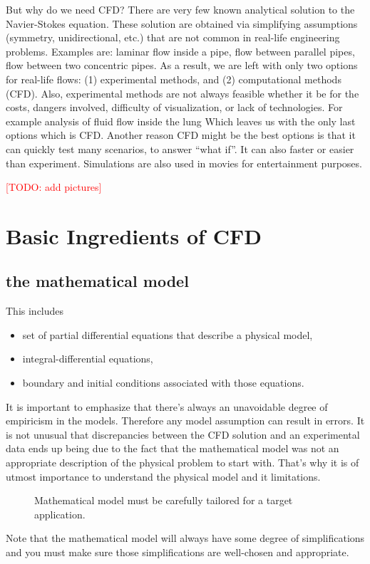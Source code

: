 But why do we need CFD?
There are very few known analytical solution to the Navier-Stokes equation.
These solution are obtained via simplifying assumptions (symmetry, unidirectional, etc.) that are not common in real-life engineering problems.
Examples are: laminar flow inside a pipe, flow between parallel pipes, flow between two concentric pipes.
As a result, we are left with only two options for real-life flows: (1) experimental methods, and (2) computational methods (CFD).
Also, experimental methods are not always feasible whether it be for the costs, dangers involved, difficulty of visualization, or lack of technologies.
For example analysis of fluid flow inside the lung
Which leaves us with the only last options which is CFD.
Another reason CFD might be the best options is that it can quickly test many scenarios, to answer ``what if''.
It can also faster or easier than experiment.
Simulations are also used in movies for entertainment purposes.

\textcolor{red}{[TODO: add pictures]}

\section{Basic Ingredients of CFD}


\subsection{the mathematical model}

This includes
\begin{itemize}
  \item set of partial differential equations that describe a physical model,
  \item integral-differential equations,
  \item boundary and initial conditions associated with those equations.
\end{itemize}
%
It is important to emphasize that there's always an unavoidable degree of empiricism in the models.
Therefore any model assumption can result in errors.
It is not unusual that discrepancies between the CFD solution and an experimental data ends up being due to the fact that the mathematical model was not an appropriate description of the physical problem to start with.
That's why it is of utmost importance to understand the physical model and it limitations.
%
\begin{figure}[ht]
  \begin{center}
    \begin{adjustbox}{width=\textwidth, keepaspectratio}
    \end{adjustbox}
  \end{center}
  \caption{Mathematical model must be carefully tailored for a target application.}\label{fig:ingredients-model}
\end{figure}
%
Note that the mathematical model will always have some degree of simplifications and you must make sure those simplifications are well-chosen and appropriate.

